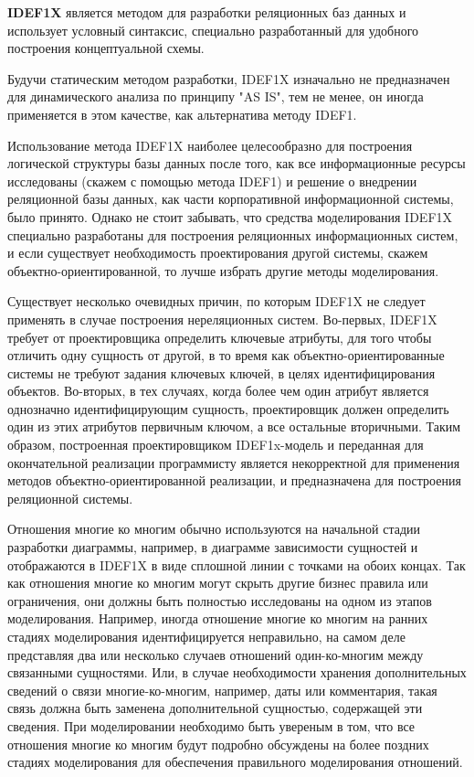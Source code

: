 \textbf{IDEF1X} является методом для разработки реляционных баз данных и
использует условный синтаксис, специально разработанный для удобного
построения концептуальной схемы.

Будучи статическим методом разработки, IDEF1X изначально не
предназначен для динамического анализа по принципу "AS IS", тем не менее,
он иногда применяется в этом качестве, как альтернатива методу IDEF1.

Использование метода IDEF1X наиболее целесообразно для построения
логической структуры базы данных после того, как все информационные
ресурсы исследованы (скажем с помощью метода IDEF1) и решение о
внедрении реляционной базы данных, как части корпоративной
информационной системы, было принято.
Однако не стоит забывать, что
средства моделирования IDEF1X специально разработаны для построения
реляционных информационных систем, и если существует необходимость
проектирования другой системы, скажем объектно-ориентированной, то
лучше избрать другие методы моделирования.

Существует несколько очевидных причин, по которым IDEF1X не
следует применять в случае построения нереляционных систем. Во-первых,
IDEF1X требует от проектировщика определить ключевые атрибуты, для того
чтобы отличить одну сущность от другой, в то время как объектно-ориентированные
системы не требуют задания ключевых ключей, в целях идентифицирования объектов.
Во-вторых, в тех случаях, когда более чем один атрибут является однозначно
идентифицирующим сущность, проектировщик должен определить один из
этих атрибутов первичным ключом, а все остальные вторичными.
Таким образом, построенная проектировщиком
IDEF1x-модель и переданная для окончательной реализации программисту
является некорректной для применения методов объектно-ориентированной
реализации, и предназначена для построения реляционной системы.

Отношения многие ко многим обычно используются на начальной стадии
разработки диаграммы, например, в диаграмме зависимости сущностей и
отображаются в IDEF1X в виде сплошной линии с точками на обоих концах. Так
как отношения многие ко многим могут скрыть другие бизнес правила или
ограничения, они должны быть полностью исследованы на одном из этапов
моделирования. Например, иногда отношение многие ко многим на ранних
стадиях моделирования идентифицируется неправильно, на самом деле
представляя два или несколько случаев отношений один-ко-многим между
связанными сущностями. Или, в случае необходимости хранения
дополнительных сведений о связи многие-ко-многим, например, даты или
комментария, такая связь должна быть заменена дополнительной сущностью,
содержащей эти сведения. При моделировании необходимо быть увереным в том,
что все отношения многие ко многим будут подробно обсуждены на более
поздних стадиях моделирования для обеспечения правильного моделирования
отношений.

